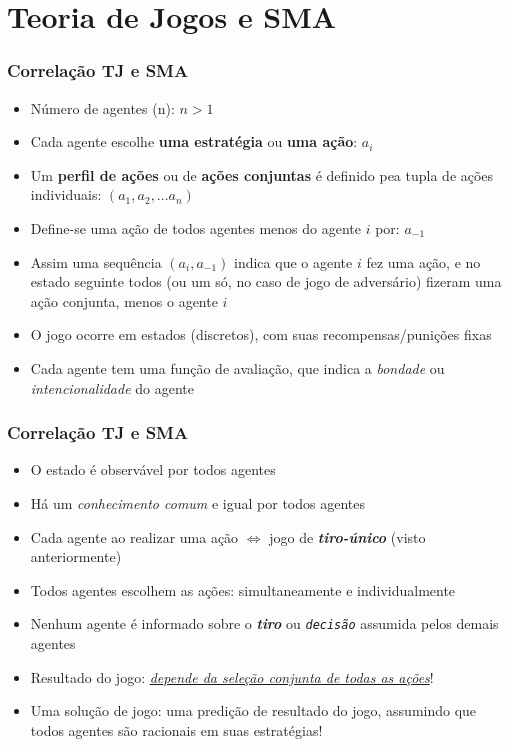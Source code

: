 \section{Teoria de Jogos e SMA}


\begin{frame}
\frametitle{Correlação TJ e SMA}

\begin{itemize}
  \item Número de agentes (n): $n > 1$
  \item Cada agente escolhe \textbf{uma estratégia} ou \textbf{uma ação}: $a_i$
  \item Um \textbf{perfil de ações} ou  de \textbf{ações conjuntas} é definido pea tupla de ações individuais: $(a_1, a_2, ...a_n)$
  \item Define-se uma ação de todos agentes menos do agente $i$ por: $a_{-1}$
  \item Assim uma sequência $(a_i,a_{-1})$ indica que o agente $i$ fez uma ação, e no estado seguinte
  todos  (ou um só, no caso de jogo de adversário) fizeram uma ação conjunta, menos o agente $i$
  \item O jogo ocorre em estados  (discretos), com suas recompensas/punições fixas
  
  \item Cada agente tem uma função de avaliação, que indica a \textit{bondade} 
  ou \textit{intencionalidade} do agente
\end{itemize}

\end{frame}




\begin{frame}
\frametitle{Correlação TJ e SMA}

\begin{itemize}
  \item O estado é observável por todos agentes
  \item Há um \textit{conhecimento comum} e igual por todos agentes
  \item Cada agente ao realizar uma ação $\Leftrightarrow $ jogo de \textbf{\textit{tiro-único}} (visto anteriormente)
  \item Todos agentes escolhem as ações: simultaneamente e individualmente
  \item Nenhum agente é informado sobre o \textbf{{\em tiro}} ou \texttt{\textit{decisão}} assumida pelos demais agentes
  \item Resultado do jogo: \textit{\underline{depende da seleção conjunta de todas as ações}}!
  \item Uma solução de jogo: uma predição de resultado do jogo, assumindo que todos agentes
  são racionais em suas estratégias!
\end{itemize}

\end{frame}


